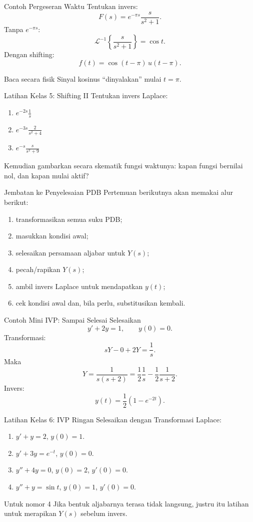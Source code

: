 \documentclass[aspectratio=169,10pt]{beamer}
\newcommand{\Lcal}{\mathcal{L}}
\newcommand{\invLap}[1]{\Lcal^{-1}\left\{#1\right\}}
\begin{document}
\begin{frame}{Contoh Pergeseran Waktu}
Tentukan invers:
\[
F(s)=e^{-\pi s}\frac{s}{s^2+1}.
\]
Tanpa $e^{-\pi s}$:
\[
\invLap{\frac{s}{s^2+1}}=\cos t.
\]
Dengan shifting:
\[
\boxed{f(t)=\cos(t-\pi)\,u(t-\pi)}.
\]
\begin{exampleblock}{Baca secara fisik}
Sinyal kosinus ``dinyalakan'' mulai $t=\pi$.
\end{exampleblock}
\end{frame}

\begin{frame}{Latihan Kelas 5: Shifting II}
Tentukan invers Laplace:
\begin{enumerate}
\item $\displaystyle e^{-2s}\frac{1}{s}$
\item $\displaystyle e^{-3s}\frac{2}{s^2+4}$
\item $\displaystyle e^{-s}\frac{s}{s^2+9}$
\end{enumerate}
Kemudian gambarkan secara skematik fungsi waktunya: kapan fungsi bernilai nol, dan kapan mulai aktif?
\end{frame}

\begin{frame}{Jembatan ke Penyelesaian PDB}
Pertemuan berikutnya akan memakai alur berikut:
\begin{enumerate}
\item transformasikan semua suku PDB;
\item masukkan kondisi awal;
\item selesaikan persamaan aljabar untuk $Y(s)$;
\item pecah/rapikan $Y(s)$;
\item ambil invers Laplace untuk mendapatkan $y(t)$;
\item cek kondisi awal dan, bila perlu, substitusikan kembali.
\end{enumerate}
\end{frame}

\begin{frame}{Contoh Mini IVP: Sampai Selesai}
Selesaikan
\[
y'+2y=1,\qquad y(0)=0.
\]
Transformasi:
\[
sY-0+2Y=\frac1s.
\]
Maka
\[
Y=\frac{1}{s(s+2)}
=\frac12\frac1s-\frac12\frac1{s+2}.
\]
Invers:
\[
\boxed{y(t)=\frac12\left(1-e^{-2t}\right)}.
\]
\end{frame}

\begin{frame}{Latihan Kelas 6: IVP Ringan}
Selesaikan dengan Transformasi Laplace:
\begin{enumerate}
\item $y'+y=2$, $y(0)=1$.
\item $y'+3y=e^{-t}$, $y(0)=0$.
\item $y''+4y=0$, $y(0)=2$, $y'(0)=0$.
\item $y''+y=\sin t$, $y(0)=1$, $y'(0)=0$.
\end{enumerate}
\begin{alertblock}{Untuk nomor 4}
Jika bentuk aljabarnya terasa tidak langsung, justru itu latihan untuk merapikan $Y(s)$ sebelum invers.
\end{alertblock}
\end{frame}
\end{document}
